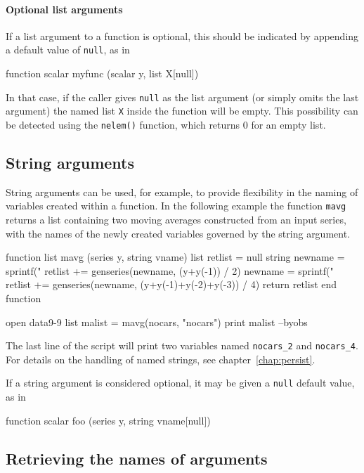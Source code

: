 \paragraph{Optional list arguments} If a list argument to a function is
optional, this should be indicated by appending a default value of
\texttt{null}, as in
%
\begin{code}
function scalar myfunc (scalar y, list X[null])
\end{code}
%
In that case, if the caller gives \texttt{null} as the list argument
(or simply omits the last argument) the named list \texttt{X} inside the
function will be empty.  This possibility can be detected using the
\texttt{nelem()} function, which returns 0 for an empty list.

\subsection{String arguments}

String arguments can be used, for example, to provide flexibility in
the naming of variables created within a function.  In the following
example the function \texttt{mavg} returns a list containing two
moving averages constructed from an input series, with the names of
the newly created variables governed by the string argument.
%
\begin{code}
function list mavg (series y, string vname)
   list retlist = null
   string newname = sprintf("%
   retlist += genseries(newname, (y+y(-1)) / 2)
   newname = sprintf("%
   retlist += genseries(newname, (y+y(-1)+y(-2)+y(-3)) / 4)
   return retlist
end function

open data9-9
list malist = mavg(nocars, "nocars")
print malist --byobs
\end{code}
%
The last line of the script will print two variables named
\verb|nocars_2| and \verb|nocars_4|.  For details on the handling of
named strings, see chapter~\ref{chap:persist}.

If a string argument is considered optional, it may be given a
\texttt{null} default value, as in
%
\begin{code}
function scalar foo (series y, string vname[null])
\end{code}

\subsection{Retrieving the names of arguments}

